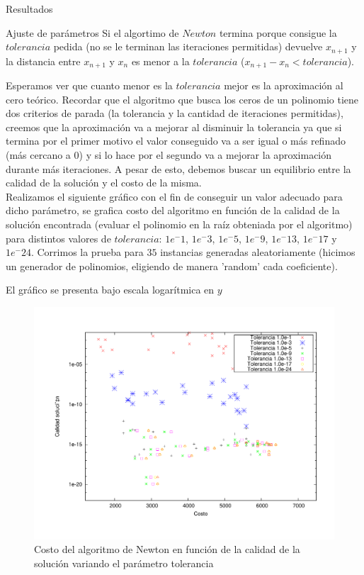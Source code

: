 \begin{section}{Resultados}
\begin{subsection}{Ajuste de parámetros}
		Si el algortimo de $Newton$ termina porque consigue la $tolerancia$ pedida (no se le terminan las iteraciones permitidas) devuelve $x_{n+1}$ y la distancia entre $x_{n+1}$ y $x_n$ es menor a la $tolerancia$ ($x_{n+1} - x_n < tolerancia$).
		
		Esperamos ver que cuanto menor es la $tolerancia$ mejor es la aproximación al cero teórico. Recordar que el algoritmo que busca los ceros de un polinomio tiene dos criterios de parada (la tolerancia y la cantidad de iteraciones permitidas), creemos que la aproximación va a mejorar al disminuir la tolerancia ya que si termina por el primer motivo el valor conseguido va a ser igual o más refinado (más cercano a 0) y si lo hace por el segundo va a mejorar la aproximación durante más iteraciones. A pesar de esto, debemos buscar un equilibrio entre la calidad de la solución y el costo de la misma.\\
		Realizamos el siguiente gráfico con el fin de conseguir un valor adecuado para dicho parámetro, se grafica costo del algoritmo en función de la calidad de la solución encontrada (evaluar el polinomio en la raíz obteniada por el algoritmo) para distintos valores de $tolerancia$: $1e^-1$, $1e^-3$, $1e^-5$, $1e^-9$, $1e^-13$, $1e^-17$ y $1e^-24$. Corrimos la prueba para $35$ instancias generadas aleatoriamente (hicimos un generador de polinomios, eligiendo de manera 'random' cada coeficiente).
		
		El gráfico se presenta bajo escala logarítmica en $y$\\

		\begin{figure}[H]
		  \centering
			\includegraphics[width=14cm]{graficos/tol_graf.pdf}
		  \caption{Costo del algoritmo de Newton en función de la calidad de la solución variando el parámetro tolerancia}
		  \label{fig:5p_r}
		\end{figure}
		

\end{subsection}
\end{section}
